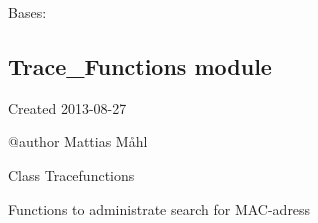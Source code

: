 \documentclass[letterpaper,10pt,english]{sphinxmanual}
\begin{document}

\begin{fulllineitems}
\label{Switch_Object:Switch_Object.sw_error}
Bases: 

\end{fulllineitems}



\subsection{Trace\_Functions module}
\label{Trace_Functions:trace-functions-module}\label{Trace_Functions:module-Trace_Functions}\label{Trace_Functions::doc}
Created 2013-08-27

@author Mattias Måhl

Class Tracefunctions

Functions to administrate search for MAC-adress
\end{document}
